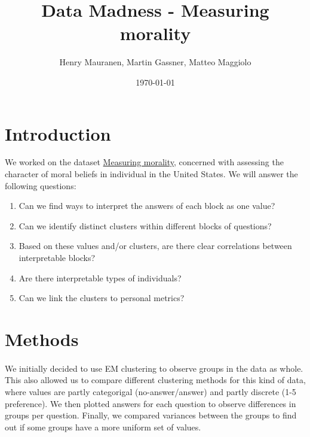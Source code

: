 \documentclass{article}
\title{Data Madness - Measuring morality}
\date{\today}
\author{Henry Mauranen, Martin Gassner, Matteo Maggiolo}
\begin{document}
\maketitle

\section{Introduction}
We worked on the dataset \href{http://kenan.ethics.duke.edu/attitudes/resources/measuring-morality/}{Measuring morality}, concerned with assessing the character of moral beliefs in individual in the United States.
We will answer the following questions:
\begin{enumerate}
\item \label{qs:aggregation} Can we find ways to interpret the answers of each block as one value? 
\item \label{qs:blockCluster} Can we identify distinct clusters within different blocks of questions? 
\item \label{qs:blockCorrelations} Based on these values and/or clusters, are there clear correlations between interpretable blocks? 
\item \label{qs:types} Are there interpretable types of individuals? 
\item \label{qs:personal} Can we link the clusters to personal metrics? 
\end{enumerate}

\section{Methods}


\paragraph{}
We initially decided to use EM clustering to observe groups in the data as whole. This also allowed us to compare different clustering methods for this kind of data, where values are partly categorigal (no-answer/answer) and partly discrete (1-5 preference). We then plotted answers for each question to observe differences in groups per question. Finally, we compared variances between the groups to find out if some groups have a more uniform set of values.
\end{document}
